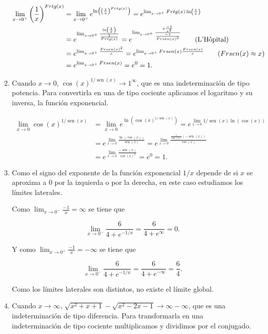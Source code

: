\documentclass[
  a4paper,
]{scrreport}
\theoremstyle{definition}
\theoremstyle{remark}
\begin{document}
\begin{tcolorbox}
\begin{enumerate}
  \begin{align*}
  \lim_{x\to 0^+}\left(\dfrac{1}{x}\right)^{\operatorname{tg}(x)}
  &= \lim_{x\to 0^+}e^{\ln\left(\left(\frac{1}{x}\right)^{\operatorname{tg}(x)}\right)}
  = e^{\lim_{x\to 0^+} \operatorname{tg}(x) \ln\left(\frac{1}{x}\right)} \\
  &= e^{\lim_{x\to 0^+} \frac{\ln\left(\frac{1}{x}\right)}{\frac{1}{\operatorname{tg}(x)}}}
  = e^{\lim_{x\to 0^+} \frac{x\frac{-1}{x^2}}{\frac{-1}{\operatorname{sen}(x)^2}}} \tag{L'Hôpital} \\
  &= e^{\lim_{x\to 0^+} \frac{\operatorname{sen}(x)^2}{x}} 
  = e^{\lim_{x\to 0^+} \operatorname{sen}(x)\frac{\operatorname{sen}(x)}{x}} \tag{$\operatorname{sen}(x)\approx x$} \\
  &= e^{\lim_{x\to 0^+} \operatorname{sen}(x)} 
  = e^0
  = 1.
  \end{align*}
\item
  Cuando \(x\to 0\), \(\cos(x)^{1/\operatorname{sen}(x)} \to 1^\infty\),
  que es una indeterminación de tipo potencia. Para convertirla en una
  de tipo cociente aplicamos el logaritmo y su inversa, la función
  exponencial.

  \begin{align*}
  \lim_{x\to 0}\cos (x)^{1/\operatorname{sen}(x)} 
  &= \lim_{x\to 0}e^{\ln\left(\cos(x)^{1/\operatorname{sen}(x)}\right)}  
  =  e^{\lim_{x\to 0}1/\operatorname{sen}(x)\ln(\cos(x))} \\
  &= e^{\lim_{x\to 0}\frac{\ln(\cos(x))}{\operatorname{sen}(x)}}
  = e^{\lim_{x\to 0}\frac{\frac{1}{\cos(x)}(-\operatorname{sen}(x))}{\cos(x)}} \tag{L'Hôpital} \\
  &= e^{\lim_{x\to 0}\frac{-\operatorname{sen}(x)}{\cos(x)^2}}
  = e^0
  = 1.
  \end{align*}
\item
  Como el signo del exponente de la función exponencial \(1/x\) depende
  de si \(x\) se aproxima a \(0\) por la izquierda o por la derecha, en
  este caso estudiamos los límites laterales.

  Como \(\lim_{x\to 0^-}\frac{-1}{x} = \infty\) se tiene que

  \[
  \lim_{x\to 0^-}\frac{6}{4+e^{-1/x}} = \frac{6}{4+e^\infty} = 0.
  \]

  Y como \(\lim_{x\to 0^+}\frac{-1}{x} = -\infty\) se tiene que

  \[
  \lim_{x\to 0^-}\frac{6}{4+e^{-1/x}} = \frac{6}{4+e^{-\infty}} = \frac{6}{4}.
  \]

  Como los límites laterales son distintos, no existe el límite global.
\item
  Cuando \(x\to \infty\),
  \(\sqrt{x^2+x+1}-\sqrt{x^2-2x-1} \to \infty-\infty\), que es una
  indeterminación de tipo diferencia. Para transformarla en una
  indeterminación de tipo cociente multiplicamos y dividimos por el
  conjugado.


\end{enumerate}
\end{tcolorbox}
\end{document}
